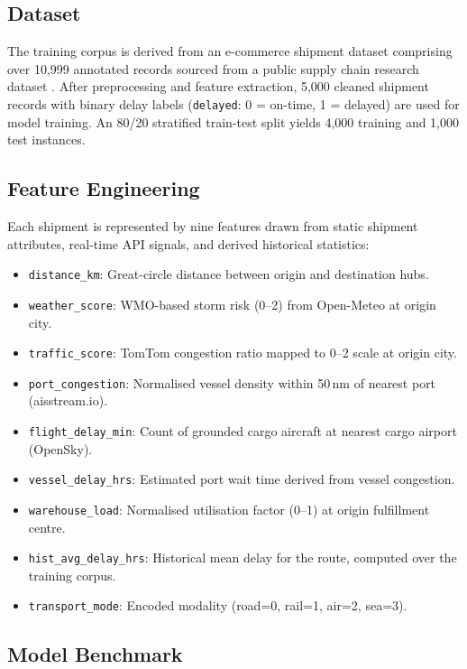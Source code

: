 \documentclass[conference]{IEEEtran}
\begin{document}
\subsection{Dataset}

The training corpus is derived from an e-commerce shipment
dataset comprising over 10,999 annotated records sourced
from a public supply chain research dataset \cite{ecommerce_dataset}.
After preprocessing and feature extraction, 5,000 cleaned
shipment records with binary delay labels
(\texttt{delayed}: 0 = on-time, 1 = delayed) are used for
model training. An 80/20 stratified train-test split yields
4,000 training and 1,000 test instances.

\subsection{Feature Engineering}

Each shipment is represented by nine features drawn from
static shipment attributes, real-time API signals, and derived
historical statistics:

\begin{itemize}
  \item \texttt{distance\_km}: Great-circle distance between
    origin and destination hubs.
  \item \texttt{weather\_score}: WMO-based storm risk (0–2)
    from Open-Meteo at origin city.
  \item \texttt{traffic\_score}: TomTom congestion ratio mapped
    to 0–2 scale at origin city.
  \item \texttt{port\_congestion}: Normalised vessel density
    within 50\,nm of nearest port (aisstream.io).
  \item \texttt{flight\_delay\_min}: Count of grounded cargo
    aircraft at nearest cargo airport (OpenSky).
  \item \texttt{vessel\_delay\_hrs}: Estimated port wait time
    derived from vessel congestion.
  \item \texttt{warehouse\_load}: Normalised utilisation
    factor (0–1) at origin fulfillment centre.
  \item \texttt{hist\_avg\_delay\_hrs}: Historical mean delay
    for the route, computed over the training corpus.
  \item \texttt{transport\_mode}: Encoded modality
    (road=0, rail=1, air=2, sea=3).
\end{itemize}

\subsection{Model Benchmark}
\end{document}
